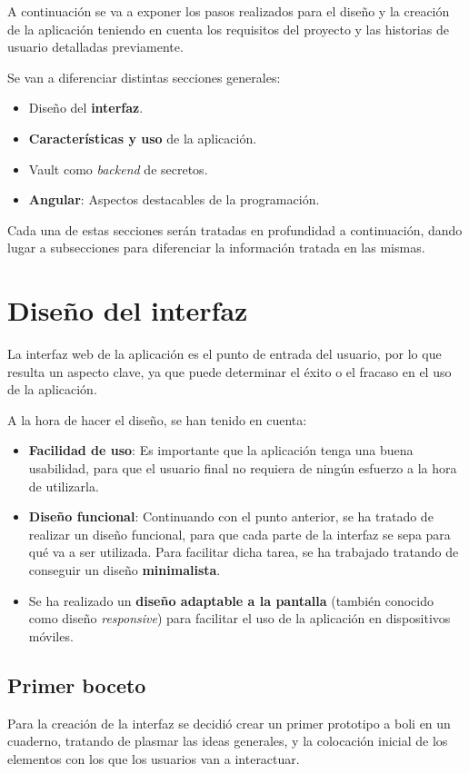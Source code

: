 \documentclass{\ClassPath/viu-tfm-template}
\begin{document}
A continuación se va a exponer los pasos realizados para el diseño y la creación de la aplicación teniendo en cuenta los requisitos del proyecto y las historias de usuario detalladas previamente.

Se van a diferenciar distintas secciones generales:
\begin{itemize}
    \item Diseño del \textbf{interfaz}.
    \item \textbf{Características y uso} de la aplicación.
    \item Vault como \textit{backend} de secretos.
    \item \textbf{Angular}: Aspectos destacables de la programación.
\end{itemize}

Cada una de estas secciones serán tratadas en profundidad a continuación, dando lugar a subsecciones para diferenciar la información tratada en las mismas.

\section{Diseño del interfaz}

La interfaz web de la aplicación es el punto de entrada del usuario, por lo que resulta un aspecto clave, ya que puede determinar el éxito o el fracaso en el uso de la aplicación.

A la hora de hacer el diseño, se han tenido en cuenta:
\begin{itemize}
    \item \textbf{Facilidad de uso}: Es importante que la aplicación tenga una buena usabilidad, para que el usuario final no requiera de ningún esfuerzo a la hora de utilizarla.
    \item \textbf{Diseño funcional}: Continuando con el punto anterior, se ha tratado de realizar un diseño funcional, para que cada parte de la interfaz se sepa para qué va a ser utilizada. Para facilitar dicha tarea, se ha trabajado tratando de conseguir un diseño \textbf{minimalista}.
    \item Se ha realizado un \textbf{diseño adaptable a la pantalla} (también conocido como diseño \textit{responsive}) para facilitar el uso de la aplicación en dispositivos móviles.
\end{itemize}


\subsection{Primer boceto}
Para la creación de la interfaz se decidió crear un primer prototipo a boli en un cuaderno, tratando de plasmar las ideas generales, y la colocación inicial de los elementos con los que los usuarios van a interactuar.
\end{document}
